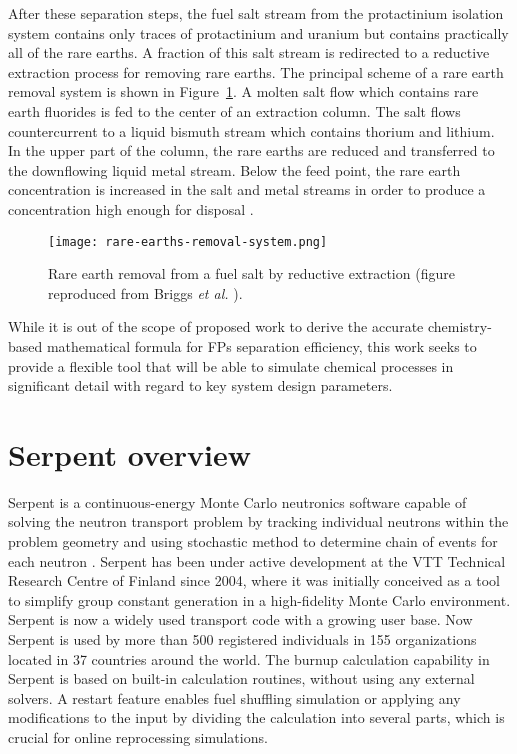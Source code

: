After these separation steps, the fuel salt stream from the protactinium 
isolation system contains only traces of protactinium and uranium but contains 
practically all of the rare earths. A fraction of this salt stream is 
redirected to a reductive extraction process for removing rare earths.  The 
principal scheme of a rare earth removal system is shown in  
Figure~\ref{fig:rare-earth-removal}. A molten salt flow which contains 
rare earth fluorides is fed to the center of an extraction column. The salt 
flows countercurrent to a liquid bismuth stream which contains thorium and 
lithium. In the upper part of the column, the rare earths are reduced and 
transferred to the downflowing liquid metal stream. Below the feed point, the 
rare earth concentration is increased in the salt and metal streams in order 
to produce a concentration high enough for disposal 
\cite{briggs_molten-salt_1969}.
\begin{figure}[htbp!]
	\centering
	\texttt{[image: rare-earths-removal-system.png]}
	\caption{Rare earth removal from a fuel salt by reductive extraction 
	(figure reproduced from Briggs \emph{et al.} 
	\cite{briggs_molten-salt_1969}).}
	\label{fig:rare-earth-removal}
\end{figure}

While it is out of the scope of proposed work to derive the accurate 
chemistry-based mathematical formula for \glspl{FP} separation efficiency, 
this work seeks to provide a flexible tool that will be able to simulate 
chemical processes in significant detail with regard to key system design 
parameters.

\section{Serpent overview}
Serpent is a continuous-energy Monte Carlo neutronics software capable of 
solving the neutron transport problem by tracking individual neutrons within 
the problem geometry and using stochastic method to determine chain of events 
for each neutron \cite{leppanen_serpent_2014}. Serpent has been under active 
development at the VTT Technical Research Centre of Finland since 2004, where 
it was initially conceived as a tool to simplify group constant generation in 
a high-fidelity Monte Carlo environment. Serpent is now a widely used 
transport code  with a growing user base. Now Serpent is used by more than 500 
registered individuals in 155 organizations located in 37 countries around the 
world. The burnup calculation capability in Serpent is based on built-in 
calculation routines, without using any external solvers. A restart feature 
enables fuel shuffling simulation or applying any modifications to the input 
by dividing the calculation into several parts, which is crucial for online 
reprocessing simulations.


